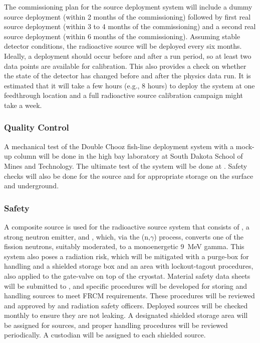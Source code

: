 The commissioning plan for the source deployment system will include a dummy source deployment (within 2 months of the commissioning) followed by first real source deployment (within 3 to 4 months of the commissioning) and a second real source deployment (within 6 months of the commissioning). Assuming stable detector conditions, the radioactive source will be deployed every six months. Ideally, a deployment should occur before and after a run period, so at least two data points are available for calibration. This also provides a check on whether the state of the detector
has changed before and after the physics data run.
It is estimated that it will take a few hours (e.g., 8 hours) to deploy the system at one feedthrough location and a full radioactive source calibration campaign might take %
a week.

\subsubsection{Quality Control}
A mechanical test of the Double Chooz fish-line deployment system with a  mock-up column will be done in the high bay laboratory at South Dakota School of Mines and Technology. The ultimate test of the system will be done at . Safety checks will also be done for the source and for appropriate storage on the surface and underground. 

\subsubsection{Safety}
\label{sec:sp-calib-rsds-safety}
A composite source is used for the radioactive source system that consists  of , a strong neutron emitter, and , which, via the (n,$\gamma$) process, converts one of the  fission neutrons, suitably moderated, to a monoenergetic \SI{9}{\MeV} gamma. This system also poses a radiation risk, which will be mitigated with a purge-box for handling and a shielded storage box and an area with lockout-tagout procedures, also applied to the gate-valve on top of the cryostat. Material safety data sheets will be submitted to  , and specific procedures will be developed for storing and handling sources to meet FRCM  requirements. These procedures will be reviewed and approved by  and  radiation safety officers. Deployed sources will be checked monthly to ensure they are not leaking. A designated shielded storage area will be assigned for sources, and proper handling procedures will be reviewed periodically. A custodian will be assigned to each shielded source.
